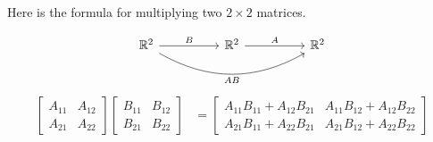Here is the formula for multiplying two $2 \times 2$ matrices.

\begin{equation*}
  \begin{tikzcd}
    \bbr^2 \ar[rr,"B"] \ar[rrrr,"AB"', bend right] && \bbr^2 \ar[rr,"A"] && \bbr^2
  \end{tikzcd}
\end{equation*}
\begin{align}
  \label{eq:eq2}
  \begin{bmatrix} A_{11} & A_{12} \\ A_{21} & A_{22} \end{bmatrix}
  \begin{bmatrix} B_{11} & B_{12} \\ B_{21} & B_{22} \end{bmatrix}
    &=
  \begin{bmatrix} A_{11} B_{11} + A_{12} B_{21} & A_{11} B_{12} + A_{12} B_{22} \\ A_{21} B_{11} + A_{22} B_{21} & A_{21} B_{12} + A_{22} B_{22} \end{bmatrix}
\end{align}


